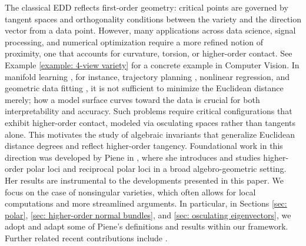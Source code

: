 \documentclass[11pt,reqno]{amsart}
\numberwithin{equation}{section}
\theoremstyle{plain}
\numberwithin{theorem}{section}
\theoremstyle{definition}
\begin{document}
The classical EDD reflects first-order geometry: critical points are governed by tangent spaces and orthogonality conditions between the variety and the direction vector from a data point. However, many applications across data science, signal processing, and numerical optimization require a more refined notion of proximity, one that accounts for curvature, torsion, or higher-order contact. See Example \ref{example: 4-view variety} for a concrete example in Computer Vision.
In manifold learning \cite{mordohai2010dimensionality,fefferman2016testing,fefferman2018fitting,amari2024adversarial,kiani2025hardness}, for instance, trajectory planning \cite{BrysonHo,zha2002optimal}, nonlinear regression, and geometric data fitting \cite{cazals2005estimating,seber1989nonlinear}, it is not sufficient to minimize the Euclidean distance merely; how a model surface curves toward the data is crucial for both interpretability and accuracy. Such problems require critical configurations that exhibit higher-order contact, modeled via osculating spaces rather than tangents alone.
This motivates the study of algebraic invariants that generalize Euclidean distance degrees and reflect higher-order tangency. Foundational work in this direction was developed by Piene in \cite{piene2022higher}, where she introduces and studies higher-order polar loci and reciprocal polar loci in a broad algebro-geometric setting. Her results are instrumental to the developments presented in this paper. We focus on the case of nonsingular varieties, which often allows for local computations and more streamlined arguments. In particular, in Sections \ref{sec: polar}, \ref{sec: higher-order normal bundles}, and \ref{sec: osculating eigenvectors}, we adopt and adapt some of Piene's definitions and results within our framework. Further related recent contributions include \cite{brandt2024voronoi,horobet2024critical,breiding2025critical}.
\end{document}
